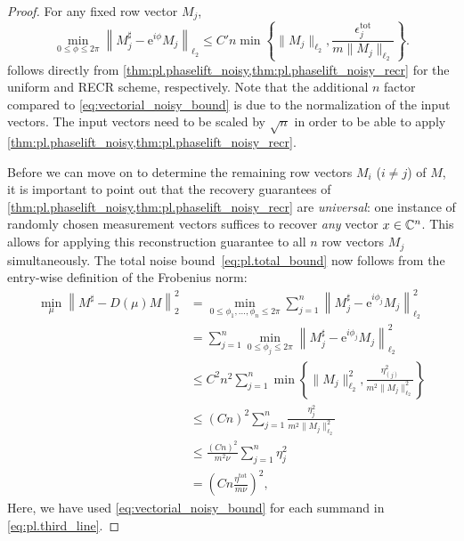 \begin{proof}
  For any fixed row vector ${M}_j$,
  \[
    \min_{0 \leq \phi \leq 2 \pi}\left\| {M}_j^\sharp - \mathrm{e}^{i \phi} {M}_j \right\|_{\ell_2} \leq C' n \min
    \left\{
    \| {M}_j \|_{\ell_2}, \frac{ \epsilon_j^{\mathrm{tot}}}{m \| {M}_j \|_{\ell_2}}
    \right\}.
    \label{eq:noisy_reconstruction_vectorial_bound}
  \]
  follows directly from \cref{thm:pl.phaselift_noisy,thm:pl.phaselift_noisy_recr} for the uniform and RECR scheme, respectively.
  Note that the additional $n$ factor compared to \cref{eq:vectorial_noisy_bound} is due to the normalization of the input vectors.
  The input vectors need to be scaled by $\sqrt{n}$ in order to be able to apply \cref{thm:pl.phaselift_noisy,thm:pl.phaselift_noisy_recr}.

  Before we can move on to determine the remaining row vectors ${M}_{i}$ ($i \neq j$) of ${M}$, it is important to point out that the recovery guarantees of \cref{thm:pl.phaselift_noisy,thm:pl.phaselift_noisy_recr} are \emph{universal}: one instance of randomly chosen measurement vectors suffices to recover \emph{any} vector ${x} \in {\mathbb{C}}^n$.
  This allows for applying this reconstruction guarantee to all $n$ row vectors ${M}_j$ simultaneously.
  The total noise bound~\eqref{eq:pl.total_bound} now follows from the entry-wise definition of the Frobenius norm:
  \begin{align}
    \min_{{\mu}}\left\|  {M}^\sharp -  {D} ({\mu}) {M} \right\|_2 ^2
    &= \min_{0 \leq \phi_1,\ldots,\phi_n \leq 2 \pi}
    \sum_{j=1}^n \left\| {M}_j^\sharp - \mathrm{e}^{i \phi_j} {M}_j \right\|_{\ell_2}^2 \\
    &= \sum_{j=1}^n \min_{0 \leq \phi_j \leq 2 \pi} \left\| {M}_j^\sharp - \mathrm{e}^{i \phi_j} {M}_j \right\|_{\ell_2}^2 \\
    \label{eq:pl.third_line}
    & \leq C^2 n^2 \sum_{j=1}^n  \min \left\{ \| {M}_j \|_{\ell_2}^2, \frac{ \eta_{(j)}^2}{m^2 \|{M}_j \|_{\ell_2}^2} \right\} \\
    &\leq \left(C n\right)^2 \sum_{j=1}^n \frac{\eta_{j}^2}{m^2 \|{M}_j \|_{\ell_2}^2} \\
    & \leq \frac{\left(Cn \right)^2}{m^2 \nu} \sum_{j=1}^n \eta_{j}^2 \\
    &= \left( C n \frac{\eta^{\mathrm{tot}}}{m \nu} \right)^2,
  \end{align}
  Here, we have used \cref{eq:vectorial_noisy_bound} for each summand in \cref{eq:pl.third_line}.
\end{proof}



